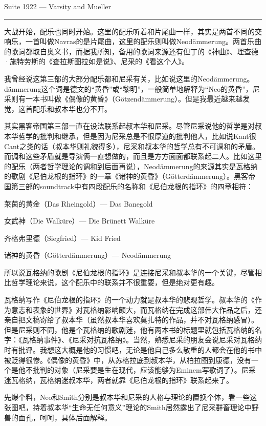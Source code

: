 \documentclass[UTF8]{ctexart}
\newcommand{\myparsep}{\noindent \rule[0.5ex]{\linewidth}{1pt}}
\begin{document}
Suite 1922 --- Varsity and Mueller

\myparsep

大战开始，配乐也同时开始。这里的配乐听着和片尾曲一样，其实是两首不同的交响乐，一首叫做Navras的是片尾曲，这里的配乐则叫做Neodämmerung。两首乐曲的歌词都取自奥义书，而据我所知，备用的歌词来源还有但丁的《神曲》、理查德·施特劳斯的《查拉斯图拉如是说》、尼采的《看这个人》。

我曾经说这第三部的大部分配乐都和尼采有关，比如说这里的Neodämmerung。dämmerung这个词是德文的“黄昏”或“黎明”，一般简单地解释为“Neo的黄昏”，尼采则有一本书叫做《偶像的黄昏》（Götzendämmerung）。但是我最近越来越发觉，这首配乐和叔本华也分不开。

其实黑客帝国第三部一直在设法联系起叔本华和尼采。尽管尼采说他的哲学是对叔本华哲学的批判和继承，但是因为尼采总是不很厚道的批判他人，比如说Kant很Cant之类的话（叔本华则礼貌得多），尼采和叔本华的哲学总有不可调和的矛盾。而调和这些矛盾就是导演俩一直想做的，而且是方方面面都联系起二人。比如这里的配乐（两者哲学理论的调和到后面再说），Neodämmerung的来源其实是瓦格纳的歌剧《尼伯龙根的指环》的一章《诸神的黄昏》（Götterdämmerung‎）。黑客帝国第三部的soundtrack中有四段配乐的名称和《尼伯龙根的指环》的四章相符：

莱茵的黄金（Das Rheingold‎）--- Das Banegold

女武神（Die Walküre‎）--- Die Brünett Walküre

齐格弗里德（Siegfried‎）--- Kid Fried

诸神的黄昏（Götterdämmerung‎）--- Neodämmerung

所以说瓦格纳的歌剧《尼伯龙根的指环》是连接尼采和叔本华的一个关键，尽管相比哲学理论来说，这个配乐中的联系并不很重要，但是绝对更有趣。

瓦格纳写作《尼伯龙根的指环》的一个动力就是叔本华的悲观哲学。叔本华的《作为意志和表象的世界》对瓦格纳影响颇大，而瓦格纳在完成这部伟大作品之后，还亲自把文稿寄给了叔本华（虽然叔本华喜欢莫扎特的作品，并不对瓦格纳感冒）。但是尼采则不同，他是个瓦格纳的歌剧迷，他有两本书的标题里就包括瓦格纳的名字：《瓦格纳事件》、《尼采对抗瓦格纳》。当然，熟悉尼采的朋友会说尼采对瓦格纳时有批评。我想这大概是他的习惯吧，无论是他自己多么敬重的人都会在他的书中被贬得很惨。《偶像的黄昏》中，从苏格拉底到叔本华，从柏拉图到康德，没有一个是他不批判的对象（尼采要是生在现代，应该能够为Eminem写歌词了）。尼采迷瓦格纳，瓦格纳迷叔本华，两者就靠《尼伯龙根的指环》联系起来了。

先爆个料，Neo和Smith分别是叔本华和尼采的人格与理论的置换个体，看一些这张图吧，持着叔本华“生命无任何意义”理论的Smith居然露出了尼采群畜理论中野兽的面孔，呵呵，具体后面解释。
\end{document}

